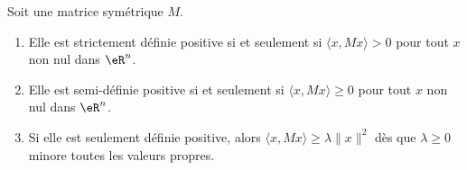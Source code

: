 \begin{lemma}   \label{LemWZFSooYvksjw}
	Soit une matrice symétrique \( M\).
	\begin{enumerate}
		\item       \label{ITEMooSKRAooOgHbGA}
		      Elle est strictement définie positive si et seulement si \( \langle x, Mx\rangle >0\) pour tout \( x\) non nul dans \( \eR^n\).
		\item       \label{ITEMooMOZYooWcrewZ}
		      Elle est semi-définie positive si et seulement si \( \langle x, Mx\rangle \geq 0\) pour tout \( x\) non nul dans \( \eR^n\).
		\item        \label{ITEMooRRMFooHSOHxZ}
		      Si elle est seulement définie positive, alors \( \langle x, Mx\rangle \geq \lambda\| x \|^2\) dès que \( \lambda\geq 0\) minore toutes les valeurs propres.
	\end{enumerate}
\end{lemma}


